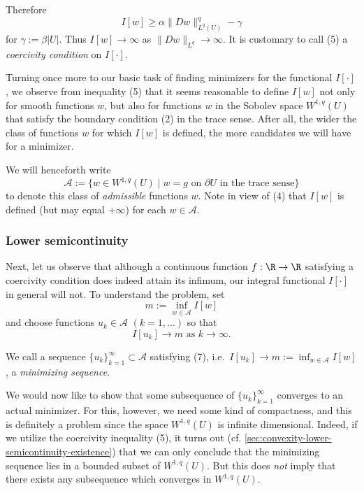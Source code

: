 Therefore
\[
I[w] \geq \alpha\|Dw\|_{L^q(U)}^q - \gamma
\tag{5}
\]
for $\gamma := \beta|U|$. Thus $I[w] \to \infty$ as $\|Dw\|_{L^q} \to \infty$. It is customary to call (5) a \textit{coercivity condition} on $I[\cdot]$.

Turning once more to our basic task of finding minimizers for the functional $I[\cdot]$, we observe from inequality (5) that it seems reasonable to define $I[w]$ not only for smooth functions $w$, but also for functions $w$ in the Sobolev space $W^{1,q}(U)$ that satisfy the boundary condition (2) in the trace sense. After all, the wider the class of functions $w$ for which $I[w]$ is defined, the more candidates we will have for a minimizer.

\begin{definition}
\label{def:admissible-class-sobolev-minimization}
We will henceforth write
\[
\mathcal{A} := \{w \in W^{1,q}(U) \mid w = g \text{ on } \partial U \text{ in the trace sense}\}
\]
to denote this class of \textit{admissible} functions $w$. Note in view of (4) that $I[w]$ is defined (but may equal $+\infty$) for each $w \in \mathcal{A}$.
\end{definition}

\subsubsection{Lower semicontinuity}

Next, let us observe that although a continuous function $f : \R \to \R$ satisfying a coercivity condition does indeed attain its infimum, our integral functional $I[\cdot]$ in general will not. To understand the problem, set
\[
m := \inf_{w \in \mathcal{A}} I[w]
\tag{6}
\]
and choose functions $u_k \in \mathcal{A}$ $(k = 1, \ldots)$ so that
\[
I[u_k] \to m \text{ as } k \to \infty.
\tag{7}
\]

\begin{definition}
\label{def:minimizing-sequence-calculus-of-variations}
We call a sequence $\{u_k\}_{k=1}^{\infty} \subset \mathcal{A}$ satisfying (7), i.e.\ $I[u_k]\to m := \inf_{w\in\mathcal{A}} I[w]$, a \textit{minimizing sequence}.
\end{definition}

We would now like to show that some subsequence of $\{u_k\}_{k=1}^{\infty}$ converges to an actual minimizer. For this, however, we need some kind of compactness, and this is definitely a problem since the space $W^{1,q}(U)$ is infinite dimensional. Indeed, if we utilize the coercivity inequality (5), it turns out (cf. \cref{sec:convexity-lower-semicontinuity-existence}) that we can only conclude that the minimizing sequence lies in a bounded subset of $W^{1,q}(U)$. But this does \textit{not} imply that there exists any subsequence which converges in $W^{1,q}(U)$.

